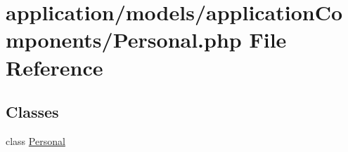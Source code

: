 \hypertarget{_personal_8php}{\section{application/models/application\-Components/\-Personal.php File Reference}
\label{_personal_8php}
}
\subsection*{Classes}
\begin{DoxyCompactItemize}
\item 
class \hyperlink{class_personal}{Personal}
\end{DoxyCompactItemize}
